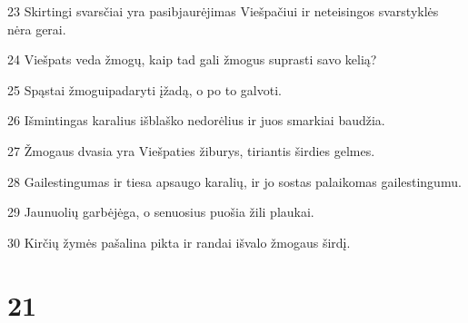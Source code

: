 \par 23 Skirtingi svarsčiai yra pasibjaurėjimas Viešpačiui ir neteisingos svarstyklės nėra gerai. 
\par 24 Viešpats veda žmogų, kaip tad gali žmogus suprasti savo kelią? 
\par 25 Spąstai žmogui­padaryti įžadą, o po to galvoti. 
\par 26 Išmintingas karalius išblaško nedorėlius ir juos smarkiai baudžia. 
\par 27 Žmogaus dvasia yra Viešpaties žiburys, tiriantis širdies gelmes. 
\par 28 Gailestingumas ir tiesa apsaugo karalių, ir jo sostas palaikomas gailestingumu. 
\par 29 Jaunuolių garbė­jėga, o senuosius puošia žili plaukai. 
\par 30 Kirčių žymės pašalina pikta ir randai išvalo žmogaus širdį.



\chapter{21}


